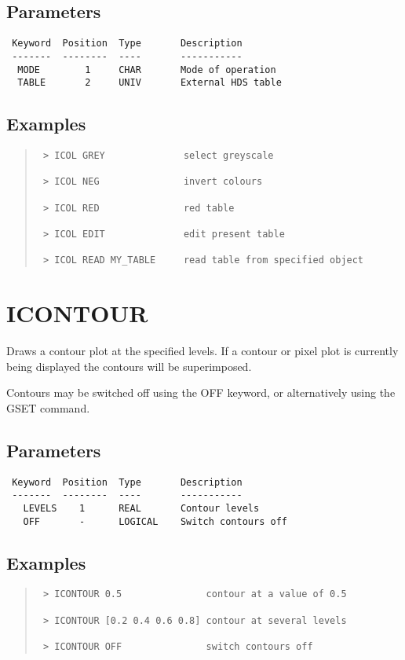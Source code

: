 \documentclass{book}
\renewcommand{\_}{{\tt\char'137}}     %
\begin{document}
\subsection{Parameters}
\begin{verbatim}
 Keyword  Position  Type       Description
 -------  --------  ----       -----------
  MODE        1     CHAR       Mode of operation
  TABLE       2     UNIV       External HDS table

\end{verbatim}\subsection{Examples}
\begin{quote}\begin{verbatim}
 > ICOL GREY              select greyscale

 > ICOL NEG               invert colours

 > ICOL RED               red table

 > ICOL EDIT              edit present table

 > ICOL READ MY_TABLE     read table from specified object
\end{verbatim}\end{quote}
\section{ICONTOUR}
Draws a contour plot at the specified levels. If a contour or
pixel plot is currently being displayed the contours will be
superimposed.

Contours may be switched off using the OFF keyword, or
alternatively using the GSET command.

\subsection{Parameters}
\begin{verbatim}
 Keyword  Position  Type       Description
 -------  --------  ----       -----------
   LEVELS    1      REAL       Contour levels
   OFF       -      LOGICAL    Switch contours off

\end{verbatim}\subsection{Examples}
\begin{quote}\begin{verbatim}
 > ICONTOUR 0.5               contour at a value of 0.5

 > ICONTOUR [0.2 0.4 0.6 0.8] contour at several levels

 > ICONTOUR OFF               switch contours off
\end{verbatim}\end{quote}
\end{document}
